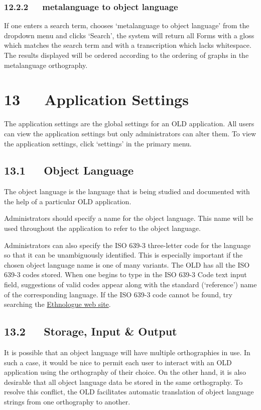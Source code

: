 \documentclass[letterpaper,10pt,english]{sphinxmanual}
\begin{document}
\subsection{12.2.2   metalanguage to object language}
\label{documentation:id24}
If one enters a search term, chooses `metalanguage to object language' from the
dropdown menu and clicks `Search', the system will return all Forms with a
gloss which matches the search term and with a transcription which lacks
whitespace.  The results displayed will be ordered according to the ordering of
graphs in the metalanguage orthography.


\chapter{13   Application Settings}
\label{documentation:application-settings}
The application settings are the global settings for an OLD application. All
users can view the application settings but only administrators can alter
them.  To view the application settings, click `settings' in the primary menu.


\section{13.1   Object Language}
\label{documentation:object-language}
The object language is the language that is being studied and documented with
the help of a particular OLD application.

Administrators should specify a name for the object language.  This name will be
used throughout the application to refer to the object language.

Administrators can also specify the ISO 639-3 three-letter code for the language
so that it can be unambiguously identified.  This is especially important if the
chosen object language name is one of many variants.  The OLD has all the ISO
639-3 codes stored.  When one begins to type in the ISO 639-3 Code text input
field, suggestions of valid codes appear along with the standard (`reference')
name of the corresponding language.  If the ISO 639-3 code cannot be found, try
searching the \href{http://www.ethnologue.com}{Ethnologue web site}.


\section{13.2   Storage, Input \& Output}
\label{documentation:storage-input-output}
It is possible that an object language will have multiple orthographies in use.
In such a case, it would be nice to permit each user to interact with an OLD
application using the orthography of their choice.  On the other hand, it is
also desirable that all object language data be stored in the same orthography.
To resolve this conflict, the OLD facilitates automatic translation of object
language strings from one orthography to another.
\end{document}

